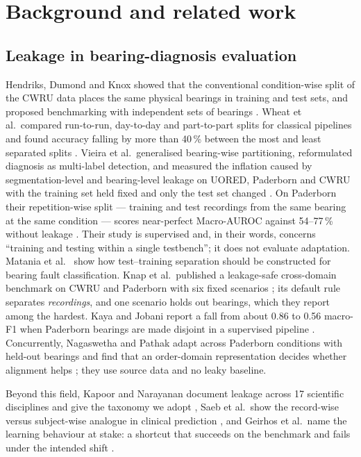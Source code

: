 \section{Background and related work}
\label{sec:background}

\subsection{Leakage in bearing-diagnosis evaluation}

Hendriks, Dumond and Knox showed that the conventional condition-wise split of the CWRU data places the same physical
bearings in training and test sets, and proposed benchmarking with independent sets of bearings \cite{hendriks2022}. Wheat et
al.\ compared run-to-run, day-to-day and part-to-part splits for classical pipelines and found accuracy falling by more than
40\,\% between the most and least separated splits \cite{wheat2024leakage}. Vieira et al.\ generalised bearing-wise
partitioning, reformulated diagnosis as multi-label detection, and measured the inflation caused by segmentation-level and
bearing-level leakage on UORED, Paderborn and CWRU with the training set held fixed and only the test set changed
\cite{vieira2026}. On Paderborn their repetition-wise split --- training and test recordings from the same bearing at the
same condition --- scores near-perfect Macro-AUROC against 54--77\,\% without leakage \cite[Table~12]{vieira2026}. Their study
is supervised and, in their words, concerns ``training and testing within a single testbench''; it does not evaluate
adaptation. Matania et al.\ \cite{matania2024leakage} show how test--training separation should be constructed for bearing
fault classification. Knap et al.\ published a leakage-safe cross-domain benchmark on CWRU and Paderborn with six fixed
scenarios \cite{knap2026leakagesafe}; its default rule separates \emph{recordings}, and one scenario holds out bearings,
which they report among the hardest. Kaya and Jobani report a fall from about 0.86 to 0.56 macro-F1 when Paderborn
bearings are made disjoint in a supervised pipeline \cite{kaya2026}. Concurrently, Nagaswetha and Pathak adapt across
Paderborn conditions with held-out bearings and find that an order-domain representation decides whether alignment helps
\cite{nagaswetha2026}; they use source data and no leaky baseline.

Beyond this field, Kapoor and Narayanan document leakage across 17 scientific disciplines and give the taxonomy we adopt
\cite{kapoor2023leakage}, Saeb et al.\ show the record-wise versus subject-wise analogue in clinical prediction
\cite{saeb2017}, and Geirhos et al.\ name the learning behaviour at stake: a shortcut that succeeds on the benchmark and fails
under the intended shift \cite{geirhos2020shortcut}.

